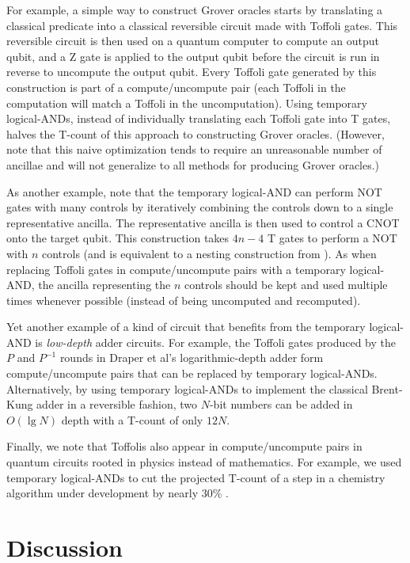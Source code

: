 \documentclass[twocolumn]{quantumarticle-customized}
\begin{document}
For example, a simple way to construct Grover oracles starts by translating a classical predicate into a classical reversible circuit made with Toffoli gates.
This reversible circuit is then used on a quantum computer to compute an output qubit, and a Z gate is applied to the output qubit before the circuit is run in reverse to uncompute the output qubit.
Every Toffoli gate generated by this construction is part of a compute/uncompute pair (each Toffoli in the computation will match a Toffoli in the uncomputation).
Using temporary logical-ANDs, instead of individually translating each Toffoli gate into T gates, halves the T-count of this approach to constructing Grover oracles.
(However, note that this naive optimization tends to require an unreasonable number of ancillae and will not generalize to all methods for producing Grover oracles.)

As another example, note that the temporary logical-AND can perform NOT gates with many controls by iteratively combining the controls down to a single representative ancilla.
The representative ancilla is then used to control a CNOT onto the target qubit.
This construction takes $4n-4$ T gates to perform a NOT with $n$ controls (and is equivalent to a nesting construction from \cite{Jones2013}).
As when replacing Toffoli gates in compute/uncompute pairs with a temporary logical-AND, the ancilla representing the $n$ controls should be kept and used multiple times whenever possible (instead of being uncomputed and recomputed).

Yet another example of a kind of circuit that benefits from the temporary logical-AND is {\em low-depth} adder circuits.
For example, the Toffoli gates produced by the $P$ and $P^{-1}$ rounds in Draper et al's logarithmic-depth adder \cite{Draper2004} form compute/uncompute pairs that can be replaced by temporary logical-ANDs.
Alternatively, by using temporary logical-ANDs to implement the classical Brent-Kung adder \cite{brent1982} in a reversible fashion, two $N$-bit numbers can be added in $O(\lg N)$ depth with a T-count of only $12N$.

Finally, we note that Toffolis also appear in compute/uncompute pairs in quantum circuits rooted in physics instead of mathematics.
For example, we used temporary logical-ANDs to cut the projected T-count of a step in a chemistry algorithm under development by nearly 30\% \cite{RyanEmails2017}.


\section*{Discussion}
\end{document}
